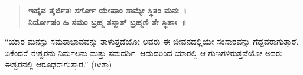 \begin{verse}
\textbf{ಇಹೈವ ತೈರ್ಜಿತಃ ಸರ್ಗೋ ಯೇಷಾಂ ಸಾಮ್ಯೇ ಸ್ಥಿತಂ ಮನಃ~।}\\\textbf{ನಿರ್ದೋಷಂ ಹಿ ಸಮಂ ಬ್ರಹ್ಮ ತಸ್ಮಾತ್​ ಬ್ರಹ್ಮಣಿ ತೇ ಸ್ಥಿತಾಃ~॥}
\end{verse}

“ಯಾರ ಮನಸ್ಸು ಸಮತಾಭಾವವನ್ನು ತಾಳುತ್ತದೆಯೋ ಅವರು ಈ ಜೀವನದಲ್ಲಿಯೇ ಸಂಸಾರವನ್ನು ಗೆದ್ದವರಾಗುತ್ತಾರೆ. ಏಕೆಂದರೆ ಈಶ್ವರನು ನಿರ್ಮಲನು ಮತ್ತು ಸಮದರ್ಶಿ. ಆದುದರಿಂದ ಯಾರಲ್ಲಿ ಆ ಗುಣಗಳಿರುತ್ತವೆಯೋ ಅವರು ಈಶ್ವರನಲ್ಲಿ ಆರೂಢರಾಗುತ್ತಾರೆ.” (ಗೀತಾ) 

